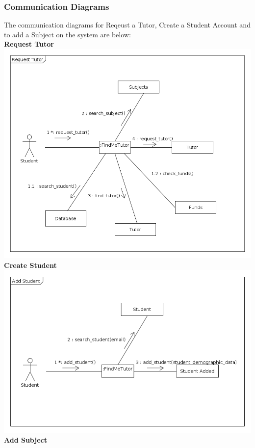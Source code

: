 \documentclass[12pt]{article}
\begin{document}
\subsubsection{Communication Diagrams}
The communication diagrams for Reqeust a Tutor, Create a Student Account and to add a Subject on the system are below:\\
\textbf{Request Tutor}\\
\includegraphics[width=140mm]{./communication_diagram/communication_diagram_rt.png}
\newpage
\textbf{Create Student}\\
\includegraphics[width=140mm]{./communication_diagram/communication_diagram_cs.png}
\newpage
\textbf{Add Subject}\\
\end{document}
